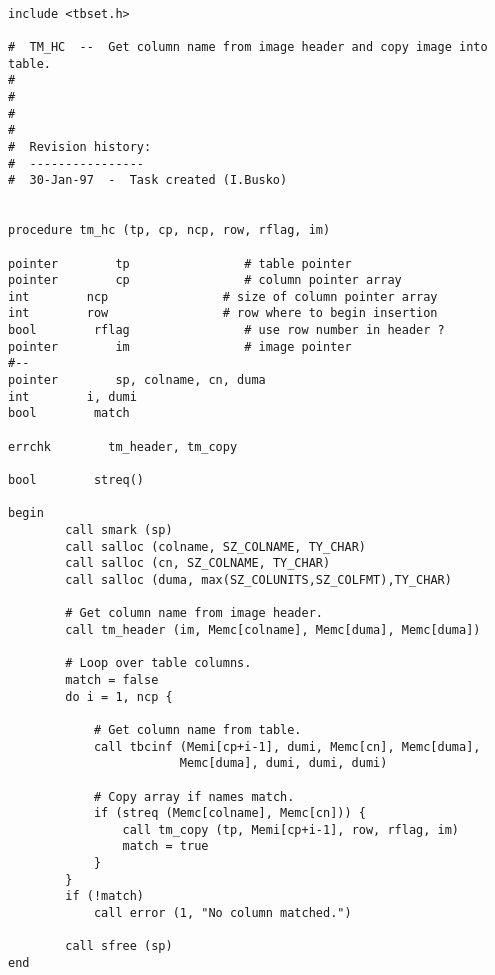\begin{verbatim}

include <tbset.h>

#  TM_HC  --  Get column name from image header and copy image into table.
#
#
#
#
#  Revision history:
#  ----------------
#  30-Jan-97  -  Task created (I.Busko)


procedure tm_hc (tp, cp, ncp, row, rflag, im)

pointer        tp                # table pointer
pointer        cp                # column pointer array
int        ncp                # size of column pointer array
int        row                # row where to begin insertion
bool        rflag                # use row number in header ?
pointer        im                # image pointer
#--
pointer        sp, colname, cn, duma
int        i, dumi
bool        match

errchk        tm_header, tm_copy

bool        streq()

begin
        call smark (sp)
        call salloc (colname, SZ_COLNAME, TY_CHAR)
        call salloc (cn, SZ_COLNAME, TY_CHAR)
        call salloc (duma, max(SZ_COLUNITS,SZ_COLFMT),TY_CHAR)

        # Get column name from image header.
        call tm_header (im, Memc[colname], Memc[duma], Memc[duma])

        # Loop over table columns.
        match = false
        do i = 1, ncp {

            # Get column name from table.
            call tbcinf (Memi[cp+i-1], dumi, Memc[cn], Memc[duma], 
                        Memc[duma], dumi, dumi, dumi)

            # Copy array if names match.
            if (streq (Memc[colname], Memc[cn])) {
                call tm_copy (tp, Memi[cp+i-1], row, rflag, im)
                match = true
            }
        }
        if (!match)
            call error (1, "No column matched.")

        call sfree (sp)
end
\end{verbatim}
\newpage
{}
